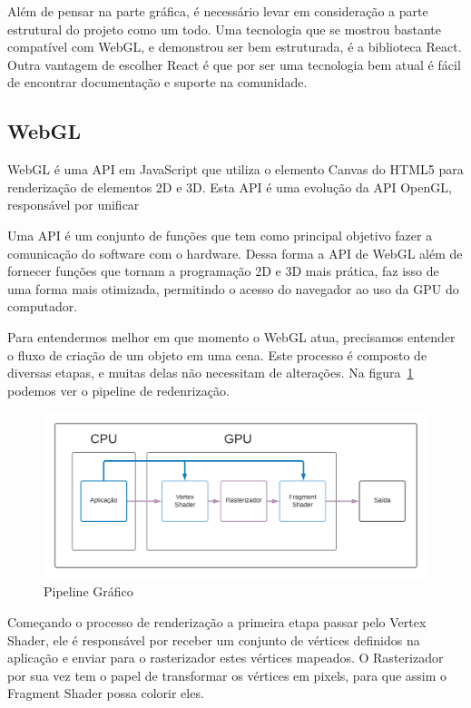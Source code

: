 \documentclass[tcc,capa]{texufpel}
\begin{document}
Além de pensar na parte gráfica, é necessário levar em consideração a parte estrutural do projeto como um todo. Uma tecnologia que se mostrou bastante compatível com WebGL, e demonstrou ser bem estruturada, é a biblioteca React. Outra vantagem de escolher React é que por ser uma tecnologia bem atual é fácil de encontrar documentação e suporte na comunidade.

\subsection{WebGL}

WebGL é uma API em JavaScript que utiliza o elemento Canvas do HTML5 para renderização de elementos 2D e 3D. Esta API é uma evolução da API OpenGL, responsável por unificar 

Uma API é um conjunto de funções que tem como principal objetivo fazer a comunicação do software com o hardware. Dessa forma a API de WebGL além de fornecer funções que tornam a programação 2D e 3D mais prática, faz isso de uma forma mais otimizada, permitindo o acesso do navegador ao uso da GPU do computador. 

Para entendermos melhor em que momento o WebGL atua, precisamos entender o fluxo de criação de um objeto em uma cena. Este processo é composto de diversas etapas, e muitas delas não necessitam de alterações. Na figura~\ref{pipeline_grafico} podemos ver o pipeline de redenrização.

\begin{figure}[htbp]
  \centering \includegraphics[scale=.7]{pipeline_grafico}
  \caption{Pipeline Gráfico}
  \label{pipeline_grafico}
\end{figure}%

Começando o processo de renderização a primeira etapa passar pelo Vertex Shader, ele é responsável por receber um conjunto de vértices definidos na aplicação e enviar para o rasterizador estes vértices mapeados. O Rasterizador por sua vez tem o papel de transformar os vértices em pixels, para que assim o Fragment Shader possa colorir eles.
\end{document}
